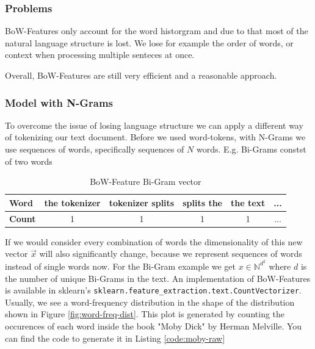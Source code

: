 \subsubsection{Problems}
BoW-Features only account for the word historgram and due to that most of the natural language structure is lost.
We lose for example the order of words, or context when processing multiple senteces at once.

Overall, BoW-Features are still very efficient and a reasonable approach.

\subsubsection{Model with N-Grams}
To overcome the issue of losing language structure we can apply a different way of tokenizing our text document.
Before we used word-tokens, with N-Grams we use sequences of words, specifically sequences of $N$ words.
E.g. Bi-Grams constst of two words
\begin{table}[h]
  \centering
  \begin{tabular}{|l|ccccc|}
    \hline
    \textbf{Word} & the tokenizer & tokenizer splits & splits the & the text & ...\\
    \hline
    \textbf{Count} & 1 & 1 & 1 & 1 & ... \\
    \hline
  \end{tabular}
  \caption{BoW-Feature Bi-Gram vector}
  \label{tab:bow-bi-gram}
\end{table}
If we would consider every combination of words the dimensionality of this new vector $\vec{x}$ will also significantly change, because we represent sequences of words instead of single words now.
For the Bi-Gram example we get $x \in \mathbb{N}^{d^2}$ where $d$ is the number of unique Bi-Grams in the text.
An implementation of BoW-Features is available in sklearn's \lstinline{sklearn.feature_extraction.text.CountVectorizer}.
Usually, we see a word-frequency distribution in the shape of the distribution shown in Figure \ref{fig:word-freq-dist}.
This plot is generated by counting the occurences of each word inside the book "Moby Dick" by Herman Melville.
You can find the code to generate it in Listing \ref{code:moby-raw}

